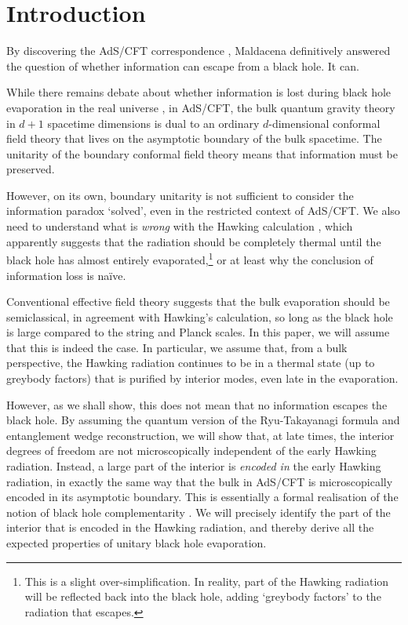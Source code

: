 \documentclass[11pt,a4paper]{article}
\begin{document}
\tableofcontents

\section{Introduction}
By discovering the AdS/CFT correspondence \cite{maldacena1999large, witten1998anti}, Maldacena definitively answered the question of whether information can escape from a black hole. It can. 

While there remains debate about whether information is lost during black hole evaporation in the real universe \cite{unruh2017information}, in AdS/CFT, the bulk quantum gravity theory in $d+1$ spacetime dimensions is dual to an ordinary $d$-dimensional conformal field theory that lives on the asymptotic boundary of the bulk spacetime. The unitarity of the boundary conformal field theory means that information must be preserved. 

However, on its own, boundary unitarity is not sufficient to consider the information paradox `solved', even in the restricted context of AdS/CFT. We also need to understand what is \emph{wrong} with the Hawking calculation \cite{hawking1974black, hawking1975particle}, which apparently suggests that the radiation should be completely thermal until the black hole has almost entirely evaporated,\footnote{This is a slight over-simplification. In reality, part of the Hawking radiation will be reflected back into the black hole, adding `greybody factors' to the radiation that escapes.} or at least why the conclusion of information loss is na\"{i}ve. 

Conventional effective field theory suggests that the bulk evaporation should be semiclassical, in agreement with Hawking's calculation, so long as the black hole is large compared to the string and Planck scales. In this paper, we will assume that this is indeed the case. In particular, we assume that, from a bulk perspective, the Hawking radiation continues to be in a thermal state (up to greybody factors) that is purified by interior modes, even late in the evaporation.

However, as we shall show, this does not mean that no information escapes the black hole. By assuming the quantum version of the Ryu-Takayanagi formula and entanglement wedge reconstruction, we will show that, at late times, the interior degrees of freedom are not microscopically independent of the early Hawking radiation. Instead, a large part of the interior is \emph{encoded in} the early Hawking radiation, in exactly the same way that the bulk in AdS/CFT is microscopically encoded in its asymptotic boundary. This is essentially a formal realisation of the notion of black hole complementarity \cite{susskind1993stretched}. We will precisely identify the part of the interior that is encoded in the Hawking radiation, and thereby derive all the expected properties of unitary black hole evaporation.
\end{document}
